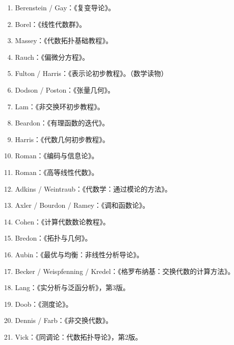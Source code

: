 \begin{enumerate}[leftmargin=3em,label=\arabic*.]
\item Berenstein / Gay：《复变导论》。
\item Borel：《线性代数群》。
\item Massey：《代数拓扑基础教程》。
\item Rauch：《偏微分方程》。
\item Fulton / Harris：《表示论初步教程》。（数学读物）
\item Dodson / Poston：《张量几何》。
\item Lam：《非交换环初步教程》。
\item Beardon：《有理函数的迭代》。
\item Harris：《代数几何初步教程》。
\item Roman：《编码与信息论》。
\item Roman：《高等线性代数》。
\item Adkins / Weintraub：《代数学：通过模论的方法》。
\item Axler / Bourdon / Ramey：《调和函数论》。
\item Cohen：《计算代数数论教程》。
\item Bredon：《拓扑与几何》。
\item Aubin：《最优与均衡：非线性分析导论》。
\item Becker / Weispfenning / Kredel：《格罗布纳基：交换代数的计算方法》。
\item Lang：《实分析与泛函分析》，第3版。
\item Doob：《测度论》。
\item Dennis / Farb：《非交换代数》。
\item Vick：《同调论：代数拓扑导论》，第2版。
\end{enumerate}
